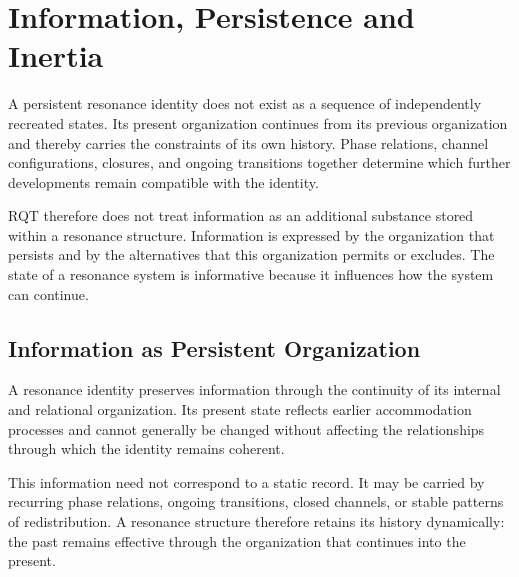\documentclass[11pt,a4paper]{article}
\begin{document}


\section{Information, Persistence and Inertia}

A persistent resonance identity does not exist as a sequence of independently recreated states. Its present organization continues from its previous organization and thereby carries the constraints of its own history. Phase relations, channel configurations, closures, and ongoing transitions together determine which further developments remain compatible with the identity.

RQT therefore does not treat information as an additional substance stored within a resonance structure. Information is expressed by the organization that persists and by the alternatives that this organization permits or excludes. The state of a resonance system is informative because it influences how the system can continue.

\subsection{Information as Persistent Organization}

A resonance identity preserves information through the continuity of its internal and relational organization. Its present state reflects earlier accommodation processes and cannot generally be changed without affecting the relationships through which the identity remains coherent.

This information need not correspond to a static record. It may be carried by recurring phase relations, ongoing transitions, closed channels, or stable patterns of redistribution. A resonance structure therefore retains its history dynamically: the past remains effective through the organization that continues into the present.
\end{document}
